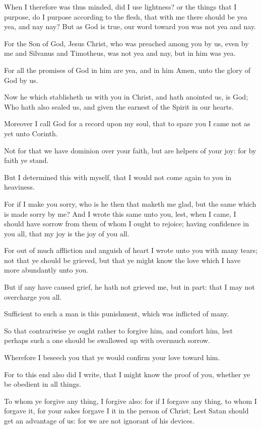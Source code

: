 \Verse When I therefore was thus minded, did I use lightness? or the things that I purpose, do I purpose according to the flesh, that with me there should be yea yea, and nay nay?  \Verse But as God is true, our word toward you was not yea and nay.

\Verse For the Son of God, Jesus Christ, who was preached among you by us, even by me and Silvanus and Timotheus, was not yea and nay, but in him was yea.

\Verse For all the promises of God in him are yea, and in him Amen, unto the glory of God by us.

\Verse Now he which stablisheth us with you in Christ, and hath anointed us, is God; \Verse Who hath also sealed us, and given the earnest of the Spirit in our hearts.

\Verse Moreover I call God for a record upon my soul, that to spare you I came not as yet unto Corinth.

\Verse Not for that we have dominion over your faith, but are helpers of your joy: for by faith ye stand.


\Chapter
\Verse But I determined this with myself, that I would not come again to you in heaviness.

\Verse For if I make you sorry, who is he then that maketh me glad, but the same which is made sorry by me?  \Verse And I wrote this same unto you, lest, when I came, I should have sorrow from them of whom I ought to rejoice; having confidence in you all, that my joy is the joy of you all.

\Verse For out of much affliction and anguish of heart I wrote unto you with many tears; not that ye should be grieved, but that ye might know the love which I have more abundantly unto you.

\Verse But if any have caused grief, he hath not grieved me, but in part: that I may not overcharge you all.

\Verse Sufficient to such a man is this punishment, which was inflicted of many.

\Verse So that contrariwise ye ought rather to forgive him, and comfort him, lest perhaps such a one should be swallowed up with overmuch sorrow.

\Verse Wherefore I beseech you that ye would confirm your love toward him.

\Verse For to this end also did I write, that I might know the proof of you, whether ye be obedient in all things.

\Verse To whom ye forgive any thing, I forgive also: for if I forgave any thing, to whom I forgave it, for your sakes forgave I it in the person of Christ; \Verse Lest Satan should get an advantage of us: for we are not ignorant of his devices.

